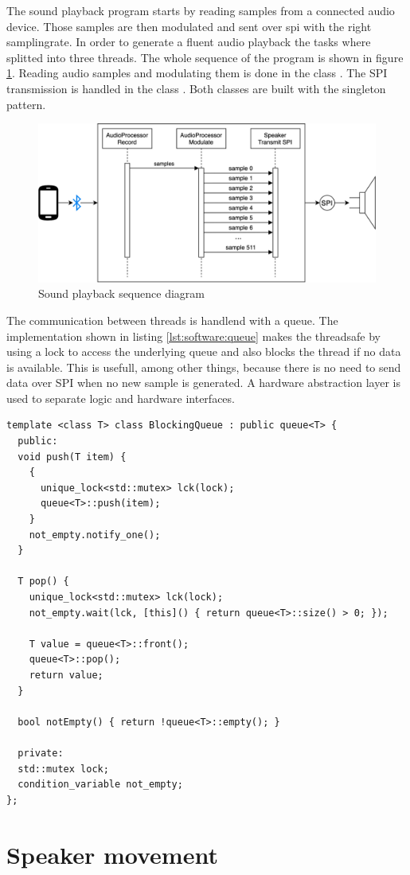 The sound playback program starts by reading samples from a connected audio device. Those samples are then modulated and sent over spi with the right samplingrate. In order to generate a fluent audio playback the tasks where splitted into three threads. The whole sequence of the program is shown in figure \ref{fig:software:sound_sequence}.\p
%
Reading audio samples and modulating them is done in the class . The SPI transmission is handled in the class . Both classes are built with the singleton pattern.
%
\begin{figure}
  \centering
  \includegraphics[width=\textwidth]{src/assets/pictures/software/sequence_diagramm.png}
  \caption{Sound playback sequence diagram}\label{fig:software:sound_sequence}
\end{figure}
\p
The communication between threads is handlend with a queue. The implementation shown in listing \ref{lst:software:queue} makes the  threadsafe by using a lock to access the underlying queue and also blocks the thread if no data is available. This is usefull, among other things, because there is no need to send data over SPI when no new sample is generated.\p
%
A hardware abstraction layer is used to separate logic and hardware interfaces.
%
\begin{mdframed}
\begin{lstlisting}[caption=Threadsafe and blocking queue, label=lst:software:queue]
template <class T> class BlockingQueue : public queue<T> {
  public:
  void push(T item) {
    {
      unique_lock<std::mutex> lck(lock);
      queue<T>::push(item);
    }
    not_empty.notify_one();
  }

  T pop() {
    unique_lock<std::mutex> lck(lock);
    not_empty.wait(lck, [this]() { return queue<T>::size() > 0; });

    T value = queue<T>::front();
    queue<T>::pop();
    return value;
  }

  bool notEmpty() { return !queue<T>::empty(); }

  private:
  std::mutex lock;
  condition_variable not_empty;
};
\end{lstlisting}
\end{mdframed}





\section{Speaker movement}
